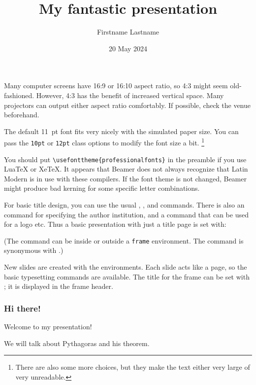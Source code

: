 \begin{practices}
Many computer screens have 16:9 or 16:10 aspect ratio, so 4:3 might seem old-fashioned.
However, 4:3 has the benefit of increased vertical space.
Many projectors can output either aspect ratio comfortably.
If possible, check the venue beforehand.
\end{practices}

The default 11~pt font fits very nicely with the simulated paper size.
You can pass the \verb|10pt| or \verb|12pt| class options to modify the font size a bit.%
\footnote{There are also some more choices,
but they make the text either very large of very unreadable.}

\begin{gotcha}
You should put \verb|\usefonttheme{professionalfonts}| in the preamble
if you use \mbox{LuaTeX} or XeTeX.
It appears that Beamer does not always recognize that Latin Modern is in use with these compilers.
If the font theme is not changed,
Beamer might produce bad kerning for some specific letter combinations.
\end{gotcha}


For basic title design, you can use the usual , , and  commands.
There is also an  command for specifying the author institution,
and a  command that can be used for a logo etc.
Thus a basic presentation with just a title page is set with:
%
\begin{ExampleCode}
\title{My fantastic presentation}
\author{Firstname Lastname}
\date{20 May 2024}



\maketitle


\end{ExampleCode}
%
%
(The  command can be inside or outside a \verb|frame| environment.
The command is synonymous with .)

New slides are created with the  environments.
Each slide acts like a page, so the basic typesetting commands are available.
The title for the frame can be set with ;
it is displayed in the frame header.
%
\begin{ExampleCode}
\begin{frame}
\frametitle{Hi there!}

Welcome to my presentation!

We will talk about Pythagoras and his theorem.
\end{frame}
\end{ExampleCode}
%

